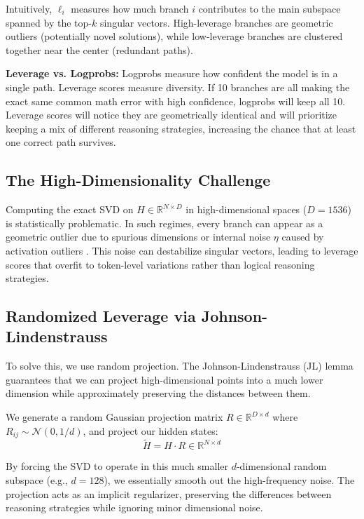 \documentclass[11pt]{article}
\begin{document}
Intuitively, $\ell_i$ measures how much branch $i$ contributes to the main subspace spanned by the top-$k$
singular vectors. High-leverage branches are geometric outliers (potentially novel solutions), while low-leverage branches are clustered together near the center (redundant paths). 

\textbf{Leverage vs. Logprobs:} Logprobs measure how confident the model is in a single path. Leverage scores measure diversity. If 10 branches are all making the exact same common math error with high confidence, logprobs will keep all 10. Leverage scores will notice they are geometrically identical and will prioritize keeping a mix of different reasoning strategies, increasing the chance that at least one correct path survives.

\subsection{The High-Dimensionality Challenge}
Computing the exact SVD on $H \in \mathbb{R}^{N \times D}$ in high-dimensional spaces ($D=1536$) is statistically problematic. In such regimes, every branch can appear as a geometric outlier due to spurious dimensions or internal noise $\eta$ caused by activation outliers \cite{Xiao2023SmoothQuant}. This noise can destabilize singular vectors, leading to leverage scores that overfit to token-level variations rather than logical reasoning strategies.

\subsection{Randomized Leverage via Johnson-Lindenstrauss}
\label{sec:random-jl}

To solve this, we use random projection. The Johnson-Lindenstrauss (JL) lemma guarantees that we can project high-dimensional points into a much lower dimension while approximately preserving the distances between them.

We generate a random Gaussian projection matrix $R \in \mathbb{R}^{D \times d}$ where $R_{ij} \sim \mathcal{N}(0, 1/d)$, and project our hidden states:
\begin{equation}
\tilde{H} = H \cdot R \in \mathbb{R}^{N \times d}
\label{eq:projection}
\end{equation}

By forcing the SVD to operate in this much smaller $d$-dimensional random subspace (e.g., $d=128$), we essentially smooth out the high-frequency noise. The projection acts as an implicit regularizer, preserving the differences between reasoning strategies while ignoring minor dimensional noise.
\end{document}
